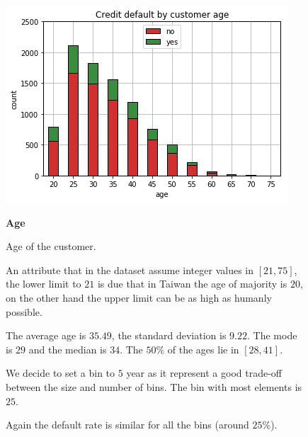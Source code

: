 \smallskip
\begin{figure}[h]
  \begin{minipage}[h]{.50\textwidth}
    \includegraphics[width=.95\textwidth]{img/ch2/age}
  \end{minipage}
  \begin{minipage}[h]{.50\textwidth}
        {\Large \textbf{Age}}
        
        Age of the customer.
        
        An attribute that in the dataset assume integer values in $[21, 75]$, the lower limit to $21$ is due that in Taiwan the age of majority is $20$, on the other hand the upper limit can be as high as humanly possible.
        
        The average age is $35.49$, the standard deviation is $9.22$.
        The mode is $29$ and the median is $34$.
        The $50\%$ of the ages lie in $[28, 41]$.
        
        We decide to set a bin to $5$ year as it represent a good trade-off between the size and number of bins. The bin with most elements is $25$.
        
        Again the default rate is similar for all the bins (around $25\%$).
  \end{minipage}
\end{figure}

\smallskip

